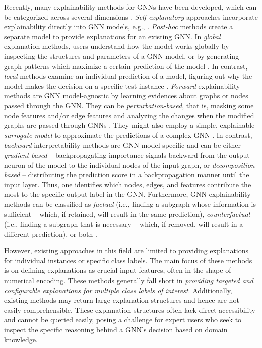 \documentclass{sig-alternate-10pt}
\begin{document}
Recently, many explainability methods for GNNs have been developed, which can be categorized across several dimensions \cite{yuan2022explainability,KJSAM23,KM23}.
{\em Self-explanatory} approaches incorporate explainability directly into GNN models, e.g., \cite{DW21,ZhangLWLL22}.
{\em Post-hoc} methods \cite{YingBYZL19,FKA21,LCXYZCZ20,YTHJ20,SCT21,VT20,YuanYWLJ21} create a separate model to provide explanations for an existing GNN.
In {\em global} explanation methods, users understand how the model works globally by inspecting the structures and parameters of a GNN model, or by generating graph patterns which maximize a certain prediction of the model \cite{YTHJ20}. In contrast, {\em local} methods examine an individual prediction of a model, figuring out why the model makes the decision on a specific test instance \cite{YingBYZL19,FKA21,SCT21,VT20,YuanYWLJ21}. {\em Forward} explainability methods are GNN model-agnostic by learning evidences about graphs or nodes passed through the GNN. They can be {\em perturbation-based}, that is, masking some node features and/or edge features and analyzing the changes when the modified graphs are passed through GNNs \cite{YingBYZL19}. They might also employ a simple, explainable {\em surrogate model} to approximate the predictions of a complex GNN \cite{VT20}. In contrast, {\em backward} interpretability methods are GNN model-specific and can be either {\em gradient-based} \cite{PKRMH18} -- backpropagating importance signals backward from the output neuron of the model to the individual nodes of the input graph, or {\em decomposition-based} \cite{SchnakeELNSMM22} -- distributing the prediction score in a backpropagation manner until the input layer. Thus, one identifies which nodes, edges, and features contribute the most to the specific output label in the GNN. Furthermore, GNN explainability methods can be classified as {\em factual} (i.e., finding a subgraph whose information is sufficient -- which, if retained, will result in the same prediction), {\em counterfactual} (i.e., finding a subgraph that is necessary -- which, if removed, will result in a different prediction), or both \cite{TGFGXLZ22}.


However, existing approaches in this field are limited to providing explanations for individual instances or specific class labels.
The main focus of these methods is on defining
explanations as crucial input features, often in the shape of numerical encoding.
These methods generally fall short in {\em providing targeted and configurable explanations for multiple class labels of interest}.
Additionally, existing methods may return large explanation structures
and hence are not easily comprehensible. These explanation structures often lack direct accessibility
and cannot be queried easily, posing a challenge for expert users who seek to
inspect the specific reasoning behind a GNN's decision based on domain knowledge.
\end{document}
